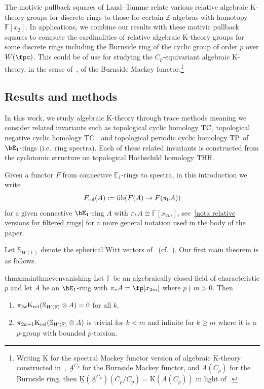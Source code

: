 \documentclass[english,10pt]{amsart}
\newcommand{\sphwf}{\mathbb{S}_{W(\mathbb{F)}}}
\newcommand{\rel}{\textup{rel}}
\DeclareMathOperator{\fib}{fib}
\newcommand{\field}{\mathbb{F}}
\theoremstyle{definition}
\numberwithin{equation}{section}
\newcommand{\ntc}{\mathrm{TC}^{-}}
\DeclareMathOperator{\tp}{\ensuremath{\textup{TP}}}
\DeclareMathOperator{\tc}{\ensuremath{\textup{TC}}}
\DeclareMathOperator{\thh}{\ensuremath{\textup{THH}}}
\newcommand{\z}{\mathbb{Z}}
\newcommand{\pis}{\pi_*}
\begin{document}
The motivic pullback squares of Land--Tamme \cite{land2023kthrypushouts} relate various relative algebraic K-theory groups for discrete rings to those for certain $\z$-algebras with homotopy $\field[x_{2}]$. In applications, we combine our results with these motivic pullback squares to compute the cardinalities of relative algebraic K-theory groups for some discrete rings including the Burnside ring of the cyclic group of order $p$ over $W(\fpc)$. This could be of use for studying the $C_p$-equivariant algebraic K-theory, in the sense of~\cite{BGS20}, of the Burnside Mackey functor.\footnote{Writing $\underline{\mathrm{K}}$ for the spectral Mackey functor version of algebraic K-theory constructed in~\cite{BGS20}, $\underline{A}^{C_p}$ for the Burnside Mackey functor, and $A(C_p)$ for the Burnside ring, then $\underline{\mathrm{K}}(\underline{A}^{C_p})(C_p/C_p)=\mathrm{K}(A(C_p))$ in light of~\cite[Example~A.7]{Yan25}.}

\subsection{Results and methods}

In this work, we study algebraic K-theory through trace methods meaning we consider related invariants such as topological cyclic homology $\tc$, topological negative cyclic homology $\ntc$ and  topological periodic cyclic homology $\tp$ of $\bE_1$-rings (i.e.\ ring spectra). Each of these related invariants is constructed from the cyclotomic structure on topological Hochschild homology $\thh$. 

Given a functor $F$ from connective $\mathbb{E}_1$-rings to spectra, in this introduction we write \[F_{\rel}(A):=\fib(F(A)\to F(\pi_0A))\]
for a given connective $\bE_1$-ring $A$ with $\pis A\cong \field[x_{2m}]$, see~\autoref{nota relative versions for filtered rings} for a more general notation used in the body of the paper.

Let $\mathbb{S}_{W(\field)}$ denote the spherical Witt vectors of~\cite[Example 5.2.7]{lurie2018ellipticII} (cf.~\cite[\S~2.1]{BSY22}). Our first main theorem is as follows.
\begin{restatable}{thmx}{mainthmevenvanishing}\label{mainthmevenvanish}
Let $\field$ be an algebraically closed field of characteristic $p$ and let $A$ be an $\bE_1$-ring with $\pis A = \fp[x_{2m}]$ where $p \nmid m>0$. Then 
\begin{enumerate}
\item\label{item 1 thmevenvanishing} $\pi_{2k}\mathrm{K}_{\rel}(\sphwf \otimes A)= 0$ for all $k$.
\item\label{item 2 thmevenvanishing}  $\pi_{2k+1}\mathrm{K}_{\rel}(\sphwf \otimes  A)$ is trivial for $k< m$ and infinite for $k\geq m$ 
 where it is a $p$-group with bounded $p$-torsion.
\end{enumerate}
\end{restatable}
\end{document}
